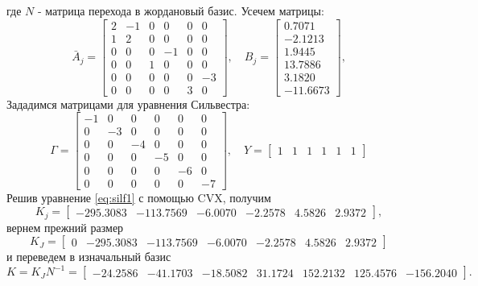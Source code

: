 где $N$ - матрица перехода в жордановый базис. Усечем матрицы:
\begin{equation*}
    \bar A_j=\begin{bmatrix}
        2 & -1 &  0 &  0 &  0 &  0 \\
        1 &  2 &  0 &  0 &  0 &  0 \\
         0 &  0 &  0 & -1 &  0 &  0 \\
         0 &  0 &  1 &  0 &  0 &  0 \\
          0 &  0 &  0 &  0 &  0 & -3 \\
         0 &  0 &  0 &  0 &  3 &  0
       \end{bmatrix},\quad
       B_j=\begin{bmatrix}
        0.7071 \\
       -2.1213 \\
        1.9445 \\
        13.7886 \\
        3.1820 \\
       -11.6673
       \end{bmatrix},
\end{equation*}
Зададимся матрицами для уравнения Сильвестра:
\begin{equation*}
    \Gamma=\begin{bmatrix}
        -1 & 0 & 0 & 0 & 0 & 0 \\
         0 & -3 & 0 & 0 & 0 & 0 \\
         0 &  0 & -4 & 0 & 0 & 0 \\
         0 &  0 &  0 & -5 & 0 & 0 \\
         0 &  0 &  0 &  0 & -6& 0 \\
         0 &  0 &  0 &  0 &  0& -7
    \end{bmatrix},\quad
    Y=\begin{bmatrix}
        1 & 1 & 1 & 1 & 1 & 1
    \end{bmatrix}
\end{equation*}
Решив уравнение \eqref{eq:silf1} с помощью CVX, получим
\begin{equation*}
    K_j=\begin{bmatrix}
        -295.3083	&-113.7569&	-6.0070&	-2.2578&	4.5826	&2.9372
    \end{bmatrix},
\end{equation*}
вернем прежний размер
\begin{equation*}
    K_J=\begin{bmatrix}
        0&-295.3083	&-113.7569&	-6.0070&	-2.2578&	4.5826	&2.9372
    \end{bmatrix}
\end{equation*}
и переведем в изначальный базис
\begin{equation*}
    K=K_JN^{-1}=\begin{bmatrix}
        -24.2586&	-41.1703&	-18.5082&	31.1724	&152.2132	&125.4576&	-156.2040
    \end{bmatrix}.
\end{equation*}

